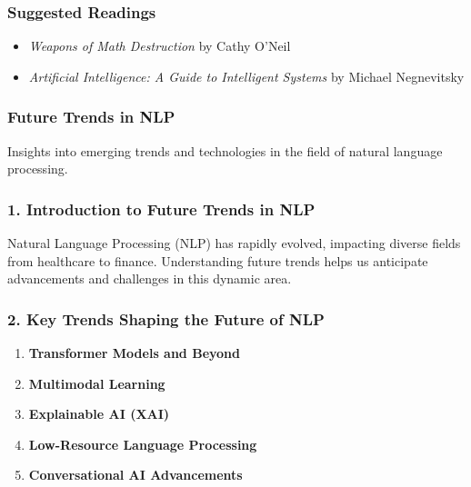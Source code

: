 \documentclass[aspectratio=169]{beamer}
\begin{document}
\begin{frame}[fragile]
    \frametitle{Suggested Readings}
    \begin{itemize}
        \item \textit{Weapons of Math Destruction} by Cathy O'Neil
        \item \textit{Artificial Intelligence: A Guide to Intelligent Systems} by Michael Negnevitsky
    \end{itemize}
\end{frame}

\begin{frame}[fragile]
    \frametitle{Future Trends in NLP}
    Insights into emerging trends and technologies in the field of natural language processing.
\end{frame}

\begin{frame}[fragile]
    \frametitle{1. Introduction to Future Trends in NLP}
    Natural Language Processing (NLP) has rapidly evolved, impacting diverse fields from healthcare to finance. 
    Understanding future trends helps us anticipate advancements and challenges in this dynamic area.
\end{frame}

\begin{frame}[fragile]
    \frametitle{2. Key Trends Shaping the Future of NLP}
    \begin{enumerate}
        \item \textbf{Transformer Models and Beyond}
        \item \textbf{Multimodal Learning}
        \item \textbf{Explainable AI (XAI)}
        \item \textbf{Low-Resource Language Processing}
        \item \textbf{Conversational AI Advancements}
    \end{enumerate}
\end{frame}
\end{document}
